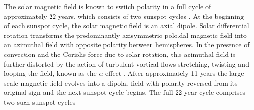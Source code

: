 \documentclass{aa}
\begin{document}
  The solar magnetic field is known to switch polarity in a full cycle of 
  approximately %
  22 years, which consists of two sunspot cycles \citep{HEN19,Babcock61}.
  At %
  the beginning of each sunspot cycle, the solar magnetic field is an axial
  dipole.
  Solar differential rotation transforms the predominantly axisymmetric
  poloidal magnetic field into an azimuthal field with opposite
  polarity between hemispheres.
  In the presence of convection and the Coriolis force due to solar rotation,
  this azimuthal field is further distorted by the 
  action of turbulent vortical flows stretching, twisting and looping the field,
  known as the 
  $\alpha$-effect \citep{SKR66,KR80}.
  After approximately 11 years the large scale magnetic field
  evolves into a dipolar field with
  polarity reversed from its original sign
  and the next sunspot cycle begins.
  The full 22 year cycle comprises two such sunspot cycles.
  
\end{document}
